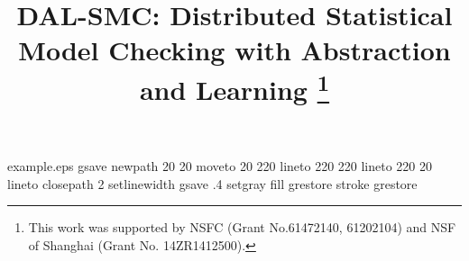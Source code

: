 %
%
%
%
%
\begin{filecontents*}{example.eps}
gsave
newpath
  20 20 moveto
  20 220 lineto
  220 220 lineto
  220 20 lineto
closepath
2 setlinewidth
gsave
  .4 setgray fill
grestore
stroke
grestore
\end{filecontents*}
%
\RequirePackage{fix-cm}

%
\documentclass[twocolumn]{svjour3}          %
%
\smartqed  %
%
\usepackage{graphicx}
\usepackage{subfigure}
\usepackage{booktabs} %
\usepackage[ruled]{algorithm2e} %
\usepackage{multirow}
\newcommand{\tabincell}[2]{\begin{tabular}{@{}#1@{}}#2\end{tabular}}
%
%
%
%
%


\title{DAL-SMC: Distributed Statistical Model Checking with Abstraction and Learning
\thanks{This work was supported by NSFC (Grant No.61472140, 61202104) and NSF of Shanghai (Grant No. 14ZR1412500).}
}


